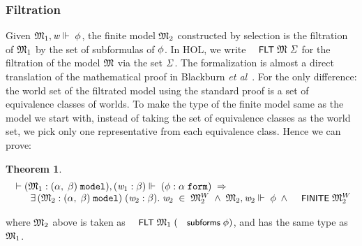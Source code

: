 \documentclass{llncs}
\newtheorem{thm}{Theorem}[chapter]
\newenvironment{holmath}{\begin{displaymath}\begin{array}{l}}{\end{array}\end{displaymath}\ignorespacesafterend}
\renewcommand{\HOLConst}[1]{{\textsf{\upshape\small #1}}}
\renewcommand{\HOLinline}[1]{\ensuremath{#1}}
\begin{document}
\subsubsection{Filtration}
Given \HOLinline{\HOLFreeVar{\ensuremath{\mathfrak{M}}}\sb{\mathrm{1}},\HOLFreeVar{w}\ensuremath{\Vdash}\;\HOLFreeVar{\ensuremath{\phi}}}, the finite model \HOLinline{\HOLFreeVar{\ensuremath{\mathfrak{M}}}\sb{\mathrm{2}}} constructed by selection is the filtration of \HOLinline{\HOLFreeVar{\ensuremath{\mathfrak{M}}}\sb{\mathrm{1}}} by the set of subformulas of \HOLinline{\HOLFreeVar{\ensuremath{\phi}}}. In HOL, we write \HOLinline{\HOLConst{FLT}\;\HOLFreeVar{\ensuremath{\mathfrak{M}}}\;\HOLFreeVar{\ensuremath{\Sigma}}} for the filtration of the model \HOLinline{\HOLFreeVar{\ensuremath{\mathfrak{M}}}} via the set \HOLinline{\HOLFreeVar{\ensuremath{\Sigma}}}. The formalization is almost a direct translation of the mathematical proof in Blackburn \emph{et al}~\cite{Blackburn}. For the only difference: the world set of the filtrated model using the standard proof is a set of equivalence classes of worlds. To make the type of the finite model same as the model we start with, instead of taking the set of equivalence classes as the world set, we pick only one representative from each equivalence class. Hence we can prove:
\begin{thm}
{\upshape\cite[Theorem 2.41 (Finite model property, via filtration)]{Blackburn}}
\begin{holmath}
  \ensuremath{\HOLTokenTurnstile}(\HOLFreeVar{\ensuremath{\mathfrak{M}}}\sb{\mathrm{1}} :(\ensuremath{\alpha},\;\ensuremath{\beta})\;\HOLTyOp{model}),(\HOLFreeVar{w}\sb{\mathrm{1}} :\ensuremath{\beta})\ensuremath{\Vdash}\;(\HOLFreeVar{\ensuremath{\phi}} :\ensuremath{\alpha}\;\HOLTyOp{form})\;\HOLSymConst{\HOLTokenImp{}}\\
\;\;\;\;\;\;\;\HOLSymConst{\HOLTokenExists{}}(\HOLBoundVar{\ensuremath{\mathfrak{M}}}\sb{\mathrm{2}} :(\ensuremath{\alpha},\;\ensuremath{\beta})\;\HOLTyOp{model})\;(\HOLBoundVar{w}\sb{\mathrm{2}} :\ensuremath{\beta}).\;\HOLBoundVar{w}\sb{\mathrm{2}}\;\HOLSymConst{\HOLTokenIn{}}\;\HOLBoundVar{\ensuremath{\mathfrak{M}}}\sb{\mathrm{2}}\HOLSymConst{\ensuremath{\sp{W}}}\;\HOLSymConst{\HOLTokenConj{}}\;\HOLBoundVar{\ensuremath{\mathfrak{M}}}\sb{\mathrm{2}},\HOLBoundVar{w}\sb{\mathrm{2}}\ensuremath{\Vdash}\;\HOLFreeVar{\ensuremath{\phi}}\;\HOLSymConst{\HOLTokenConj{}}\;\HOLConst{FINITE}\;\HOLBoundVar{\ensuremath{\mathfrak{M}}}\sb{\mathrm{2}}\HOLSymConst{\ensuremath{\sp{W}}}
\end{holmath}
\end{thm}
where \HOLinline{\HOLFreeVar{\ensuremath{\mathfrak{M}}}\sb{\mathrm{2}}} above is taken as \HOLinline{\HOLConst{FLT}\;\HOLFreeVar{\ensuremath{\mathfrak{M}}}\sb{\mathrm{1}}\;(\HOLConst{subforms}\;\HOLFreeVar{\ensuremath{\phi}})}, and has the same type as \HOLinline{\HOLFreeVar{\ensuremath{\mathfrak{M}}}\sb{\mathrm{1}}}. 
\end{document}
